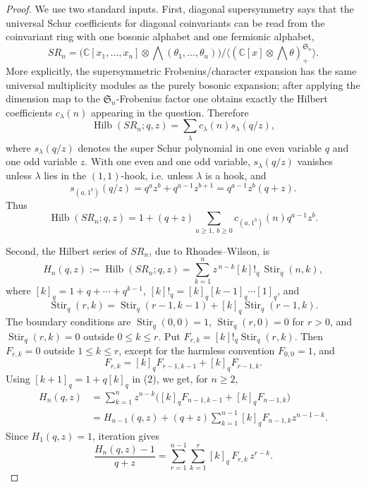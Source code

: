 \documentclass[12pt]{article}
\newcommand{\Hilb}{\operatorname{Hilb}}
\newcommand{\Stir}{\operatorname{Stir}}
\begin{document}
\begin{proof}
We use two standard inputs.  First, diagonal supersymmetry says that the
universal Schur coefficients for diagonal coinvariants can be read from the
coinvariant ring with one bosonic alphabet and one fermionic alphabet,
\[
 SR_n=\bigl(\mathbb C[x_1,\ldots,x_n]\otimes
          \bigwedge(\theta_1,\ldots,\theta_n)\bigr)
/\langle(\mathbb C[x]\otimes\bigwedge\theta)^{\mathfrak S_n}_{+}\rangle .
\]
More explicitly, the supersymmetric Frobenius/character expansion has the same
universal multiplicity modules as the purely bosonic expansion; after applying
the dimension map to the \(\mathfrak S_n\)-Frobenius factor one obtains exactly
the Hilbert coefficients \(c_\lambda(n)\) appearing in the question.  Therefore
\[
        \Hilb(SR_n;q,z)=\sum_\lambda c_\lambda(n)s_\lambda(q/z),
\]
where \(s_\lambda(q/z)\) denotes the super Schur polynomial in one even variable
\(q\) and one odd variable \(z\).  With one even and one odd variable,
\(s_\lambda(q/z)\) vanishes unless \(\lambda\) lies in the \((1,1)\)-hook, i.e.
unless \(\lambda\) is a hook, and
\[
        s_{(a,1^b)}(q/z)=q^a z^b+q^{a-1}z^{b+1}
        =q^{a-1}z^b(q+z).
\]
Thus
\[
        \Hilb(SR_n;q,z)
        =1+(q+z)\sum_{a\ge1,\ b\ge0}
              c_{(a,1^b)}(n)q^{a-1}z^b .          \tag{1}
\]

Second, the Hilbert series of \(SR_n\), due to Rhoades--Wilson, is
\[
        H_n(q,z):=\Hilb(SR_n;q,z)
        =\sum_{k=1}^{n} z^{\,n-k}[k]!_q\,\Stir_q(n,k),                 \tag{2}
\]
where \([k]_q=1+q+\cdots+q^{k-1}\), \([k]!_q=[k]_q[k-1]_q\cdots[1]_q\), and
\[
        \Stir_q(r,k)=\Stir_q(r-1,k-1)+[k]_q\Stir_q(r-1,k).
\]
The boundary conditions are
\(\Stir_q(0,0)=1\), \(\Stir_q(r,0)=0\) for \(r>0\), and
\(\Stir_q(r,k)=0\) outside \(0\le k\le r\).  Put
\(F_{r,k}=[k]!_q\Stir_q(r,k)\).  Then \(F_{r,k}=0\) outside
\(1\le k\le r\), except for the harmless convention \(F_{0,0}=1\), and
\[
        F_{r,k}=[k]_qF_{r-1,k-1}+[k]_qF_{r-1,k}.
\]
Using \([k+1]_q=1+q[k]_q\) in (2), we get, for \(n\ge2\),
\[
\begin{aligned}
H_n(q,z)
&=\sum_{k=1}^{n}z^{n-k}\bigl([k]_qF_{n-1,k-1}
                         +[k]_qF_{n-1,k}\bigr)\\
&=H_{n-1}(q,z)
 +(q+z)\sum_{k=1}^{n-1}[k]_qF_{n-1,k}z^{n-1-k}.
\end{aligned}
\]
Since \(H_1(q,z)=1\), iteration gives
\[
        \frac{H_n(q,z)-1}{q+z}
        =
        \sum_{r=1}^{n-1}\sum_{k=1}^{r}
             [k]_q\,F_{r,k}\,z^{r-k}.                    \tag{3}
\]


\end{proof}
\end{document}
